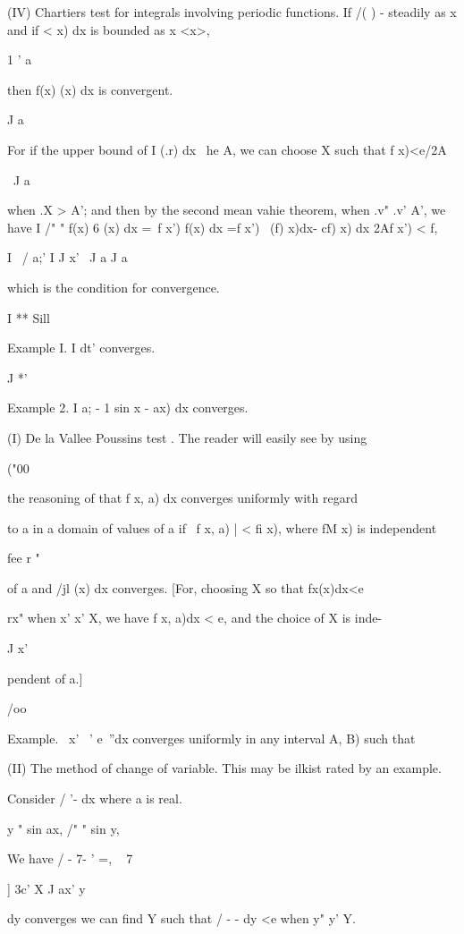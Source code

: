 (IV) Chartiers test for integrals involving periodic functions. If /(
) - steadily as x and if < x) dx is bounded as x <x>,

1 ' a

then f(x) (x) dx is convergent.

J a

For if the upper bound of I (.r) dx \ he A, we can choose X such that
f x)<e/2A

\ J a

when .X > A'; and then by the second mean vahie theorem, when .v" .v'
A', we have I /" " f(x) 6 (x) dx =\ f x') f(x) dx =f x') \ (f) x)dx-
cf) x) dx 2Af x') < f,

I \ / a;'  I J x' \ J a J a

which is the condition for convergence.

I ** Sill

Example I. I dt' converges.

J *'

Example 2. I a; - 1 sin x - ax) dx converges.


(I) De la Vallee Poussins test . The reader will easily see by using

("00

the reasoning of  that f x, a) dx converges uniformly with
regard

to a in a domain of values of a if \ f x, a) | < fi x), where fM x) is
independent

fee r "

of a and /jl (x) dx converges. [For, choosing X so that fx(x)dx<e

rx" when x' x' X, we have f x, a)dx < e, and the choice of X is inde-

J x'

pendent of a.]

/oo

Example. \ x' ~' e~''dx converges uniformly in any interval A, B) such
that

(II) The method of change of variable. This may be ilkist rated by an
example.

Consider / '- dx where a is real.

y " sin ax, /" " sin y,

We have / - 7- ' =, ~ 7~

] 3c' X J ax' y

   dy converges we can find Y such that / - - dy <e when y" y' Y.


